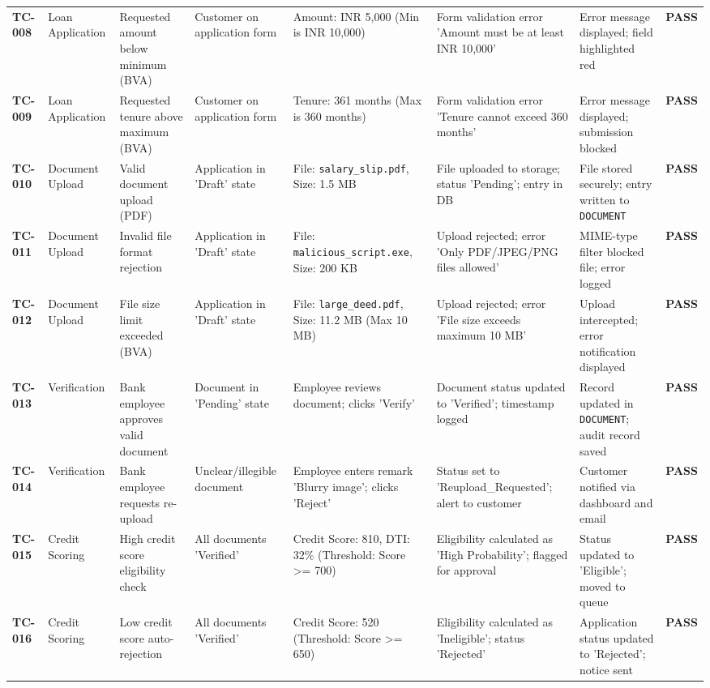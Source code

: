 \begin{table}[htbp]
{\begin{tabular}{l l l l l l l l}
\textbf{TC-008} & Loan Application & Requested amount below minimum (BVA) & Customer on application form & Amount: INR 5,000 (Min is INR 10,000) & Form validation error 'Amount must be at least INR 10,000' & Error message displayed; field highlighted red & \textbf{PASS} \\
\textbf{TC-009} & Loan Application & Requested tenure above maximum (BVA) & Customer on application form & Tenure: 361 months (Max is 360 months) & Form validation error 'Tenure cannot exceed 360 months' & Error message displayed; submission blocked & \textbf{PASS} \\
\textbf{TC-010} & Document Upload & Valid document upload (PDF) & Application in 'Draft' state & File: \texttt{salary\_slip.pdf}, Size: 1.5 MB & File uploaded to storage; status 'Pending'; entry in DB & File stored securely; entry written to \texttt{DOCUMENT} & \textbf{PASS} \\
\textbf{TC-011} & Document Upload & Invalid file format rejection & Application in 'Draft' state & File: \texttt{malicious\_script.exe}, Size: 200 KB & Upload rejected; error 'Only PDF/JPEG/PNG files allowed' & MIME-type filter blocked file; error logged & \textbf{PASS} \\
\textbf{TC-012} & Document Upload & File size limit exceeded (BVA) & Application in 'Draft' state & File: \texttt{large\_deed.pdf}, Size: 11.2 MB (Max 10 MB) & Upload rejected; error 'File size exceeds maximum 10 MB' & Upload intercepted; error notification displayed & \textbf{PASS} \\
\textbf{TC-013} & Verification & Bank employee approves valid document & Document in 'Pending' state & Employee reviews document; clicks 'Verify' & Document status updated to 'Verified'; timestamp logged & Record updated in \texttt{DOCUMENT}; audit record saved & \textbf{PASS} \\
\textbf{TC-014} & Verification & Bank employee requests re-upload & Unclear/illegible document & Employee enters remark 'Blurry image'; clicks 'Reject' & Status set to 'Reupload\_Requested'; alert to customer & Customer notified via dashboard and email & \textbf{PASS} \\
\textbf{TC-015} & Credit Scoring & High credit score eligibility check & All documents 'Verified' & Credit Score: 810, DTI: 32\% (Threshold: Score >= 700) & Eligibility calculated as 'High Probability'; flagged for approval & Status updated to 'Eligible'; moved to queue & \textbf{PASS} \\
\textbf{TC-016} & Credit Scoring & Low credit score auto-rejection & All documents 'Verified' & Credit Score: 520 (Threshold: Score >= 650) & Eligibility calculated as 'Ineligible'; status 'Rejected' & Application status updated to 'Rejected'; notice sent & \textbf{PASS} \\

\end{tabular}}
\end{table}
